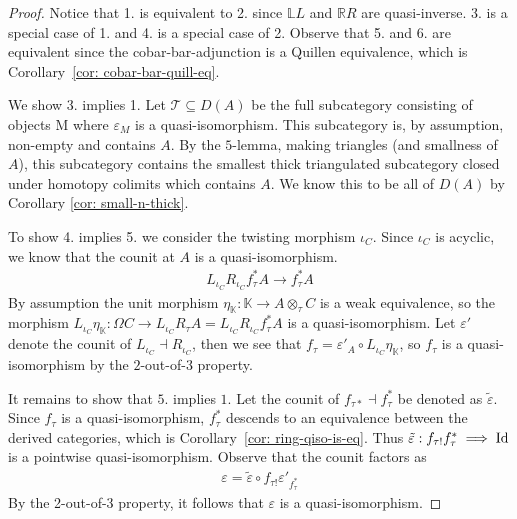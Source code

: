 \documentclass[../thesis.tex]{subfiles}
\begin{document}
            \begin{proof}
                Notice that 1. is equivalent to 2. since $\mathbb{L}L$ and $\mathbb{R}R$ are quasi-inverse. 3. is a special case of 1. and 4. is a special case of 2. Observe that 5. and 6. are equivalent since the cobar-bar-adjunction is a Quillen equivalence, which is Corollary~\ref{cor: cobar-bar-quill-eq}.

                We show 3. implies 1. Let $\mathcal{T}\subseteq D(A)$ be the full subcategory consisting of objects M where $\varepsilon_M$ is a quasi-isomorphism. This subcategory is, by assumption, non-empty and contains $A$. By the $5$-lemma, making triangles (and smallness of $A$), this subcategory contains the smallest thick triangulated subcategory closed under homotopy colimits which contains $A$. We know this to be all of $D(A)$ by Corollary \ref{cor: small-n-thick}.

                To show 4. implies 5. we consider the twisting morphism $\iota_C$. Since $\iota_C$ is acyclic, we know that the counit at $A$ is a quasi-isomorphism. 
                \begin{align*}
                    L_{\iota_C}R_{\iota_C}f_{\tau}^*A \rightarrow f_\tau^*A
                \end{align*}
                By assumption the unit morphism $\eta_\mathbb{K} : \mathbb{K} \rightarrow A \otimes_\tau C$ is a weak equivalence, so the morphism $L_{\iota_C}\eta_\mathbb{K} : \Omega C \rightarrow L_{\iota_C}R_\tau A = L_{\iota_C}R_{\iota_C}f_\tau^* A$ is a quasi-isomorphism. Let $\varepsilon'$ denote the counit of $L_{\iota_C} \dashv R_{\iota_C}$, then we see that $f_\tau = \varepsilon'_A \circ L_{\iota_C}\eta_\mathbb{K}$, so $f_\tau$ is a quasi-isomorphism by the $2$-out-of-$3$ property.

                It remains to show that $5$. implies $1$. Let the counit of $f_{\tau *} \dashv f_\tau^*$ be denoted as $\tilde{\varepsilon}$. Since $f_\tau$ is a quasi-isomorphism, $f_\tau^*$ descends to an equivalence between the derived categories, which is Corollary~\ref{cor: ring-qiso-is-eq}. Thus $\tilde{\varepsilon} : f_{\tau !}f_\tau^* \implies \tt{Id}$ is a pointwise quasi-isomorphism. Observe that the counit factors as
                \begin{align*}
                    \varepsilon = \tilde{\varepsilon} \circ f_{\tau !}\varepsilon'_{f_\tau^*}
                \end{align*}
                By the 2-out-of-3 property, it follows that $\varepsilon$ is a quasi-isomorphism.
            \end{proof}
\end{document}
